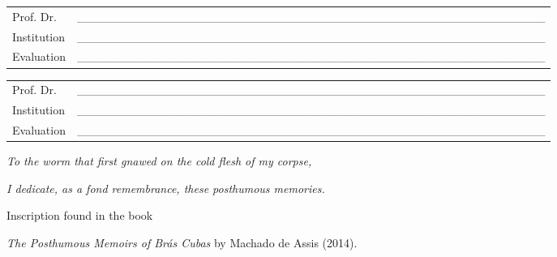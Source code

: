 \documentclass[
  12pt,
  a4paper,
  oneside]{tesesusp}
\begin{document}
\begin{folhadeaprovacao}
  \vspace*{0.5cm}

  \noindent
  \begin{tabular}{m{2cm} P{14cm}}
    Prof. Dr. & \_\_\_\_\_\_\_\_\_\_\_\_\_\_\_\_\_\_\_\_\_\_\_\_\_\_\_\_\_\_\_\_\_\_\_\_\_\_\_\_\_\_\_\_\_\_\_\_\_\_\_\_\_\_\_ \\
    Institution & \_\_\_\_\_\_\_\_\_\_\_\_\_\_\_\_\_\_\_\_\_\_\_\_\_\_\_\_\_\_\_\_\_\_\_\_\_\_\_\_\_\_\_\_\_\_\_\_\_\_\_\_\_\_\_ \\
    Evaluation & \_\_\_\_\_\_\_\_\_\_\_\_\_\_\_\_\_\_\_\_\_\_\_\_\_\_\_\_\_\_\_\_\_\_\_\_\_\_\_\_\_\_\_\_\_\_\_\_\_\_\_\_\_\_\_ \\
  \end{tabular}

  \vspace*{0.5cm}

  \noindent
  \begin{tabular}{m{2cm} P{14cm}}
    Prof. Dr. & \_\_\_\_\_\_\_\_\_\_\_\_\_\_\_\_\_\_\_\_\_\_\_\_\_\_\_\_\_\_\_\_\_\_\_\_\_\_\_\_\_\_\_\_\_\_\_\_\_\_\_\_\_\_\_ \\
    Institution & \_\_\_\_\_\_\_\_\_\_\_\_\_\_\_\_\_\_\_\_\_\_\_\_\_\_\_\_\_\_\_\_\_\_\_\_\_\_\_\_\_\_\_\_\_\_\_\_\_\_\_\_\_\_\_ \\
    Evaluation & \_\_\_\_\_\_\_\_\_\_\_\_\_\_\_\_\_\_\_\_\_\_\_\_\_\_\_\_\_\_\_\_\_\_\_\_\_\_\_\_\_\_\_\_\_\_\_\_\_\_\_\_\_\_\_ \\
  \end{tabular}
\end{folhadeaprovacao}


\begin{dedicatoria}
  \vspace*{\fill}
  \centering
\emph{To the worm that first gnawed on the cold flesh of my corpse,}

\emph{I dedicate, as a fond remembrance, these posthumous memories.}

\vspace{1cm}

Inscription found in the book

\emph{The Posthumous Memoirs of Brás Cubas} by Machado de Assis (2014).
	\vspace*{\fill}
\end{dedicatoria}
\end{document}
